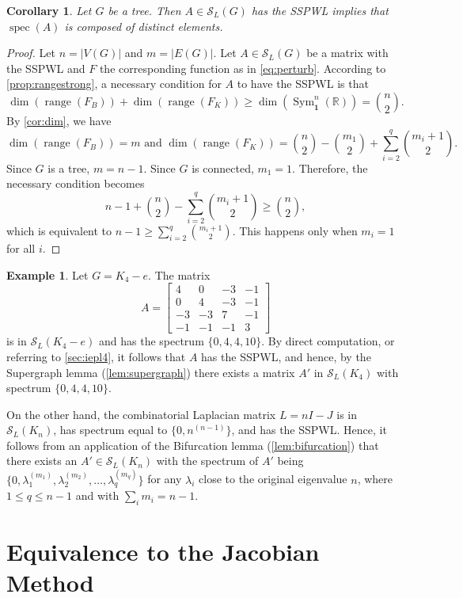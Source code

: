 \documentclass{article}
\newtheorem{corollary}[theorem]{Corollary}
\theoremstyle{definition}
\newtheorem{example}[theorem]{Example}
\newcommand{\bone}{\mathbf{1}}
\newcommand{\range}{\operatorname{range}}
\newcommand{\spec}{\operatorname{spec}}
\newcommand{\msymz}[1][n]{\operatorname{Sym}_{\bone}^{#1}(\mathbb{R})}
\newcommand{\mptn}{\mathcal{S}}
\begin{document}
\begin{corollary}
\label{cor:tree-SSPWL}
Let $G$ be a tree.  Then $A\in\mptn_L(G)$ has the SSPWL implies that $\spec(A)$ is composed of distinct elements.
\end{corollary}
\begin{proof}
Let $n = |V(G)|$ and $m = |E(G)|$.  Let $A\in\mptn_L(G)$ be a matrix with the SSPWL and $F$ the corresponding function as in \cref{eq:perturb}.  According to \cref{prop:rangestrong}, a necessary condition for $A$ to have the SSPWL is that 
\[
    \dim(\range(F_B)) + \dim(\range(F_K)) \geq \dim(\msymz) = \binom{n}{2}.
\]
By \cref{cor:dim}, we have 
\[
    \dim(\range(F_B)) = m \text{ and } \dim(\range(F_K)) = \binom{n}{2} - \binom{m_1}{2} + \sum_{i=2}^q\binom{m_i + 1}{2}.
\]
Since $G$ is a tree, $m = n - 1$.  Since $G$ is connected, $m_1 = 1$.  Therefore, the necessary condition becomes
\[
    n - 1 + \binom{n}{2} - \sum_{i=2}^q\binom{m_i + 1}{2} \geq \binom{n}{2},
\]
which is equivalent to $n - 1 \geq \sum_{i=2}^q\binom{m_i + 1}{2}$.  This happens only when $m_i = 1$ for all $i$.
\end{proof}

\begin{example}
Let $G=K_4-e$.  The matrix  
\[
   A= \begin{bmatrix}
        4 & 0 & -3 & -1 \\
        0 & 4 & -3 & -1 \\
        -3 & -3 & 7 & -1 \\
        -1 & -1 & -1 & 3
    \end{bmatrix}
\]
is in $\mptn_L(K_4-e)$ and has the spectrum $\{0,4,4,10\}$. By direct computation, or referring to \cref{sec:iepl4}, it follows that $A$ has the SSPWL, and hence, by the Supergraph lemma (\cref{lem:supergraph}) there exists a matrix $A'$ in $\mptn_L(K_4)$ with spectrum $\{0,4,4,10\}$. 

On the other hand, the combinatorial Laplacian matrix $L=nI-J$ is in $\mptn_L(K_n)$, has spectrum equal to $\{0, n^{(n-1)}\}$, and has the SSPWL. Hence, it follows from an application of the Bifurcation lemma (\cref{lem:bifurcation}) that there exists an $A' \in \mptn_L(K_n)$ with the spectrum of $A'$ being $\{0, \lambda_{1}^{(m_1)}, \lambda_{2}^{(m_2)}, \ldots, \lambda_{q}^{(m_q)}\}$ for any $\lambda_i$ close to the original eigenvalue $n$, where $1 \leq q \leq n-1$ and with $\sum_i m_i = n-1$.
\end{example}

\section{Equivalence to the Jacobian Method}
\label{sec:jac}
\end{document}
